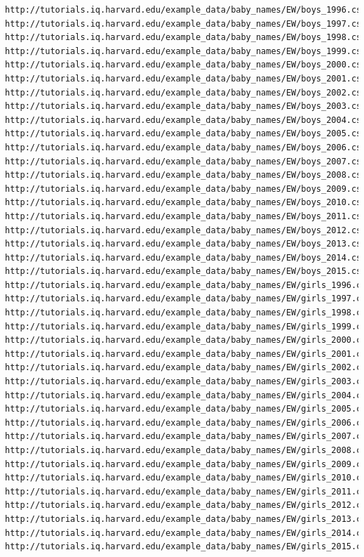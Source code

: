 \documentclass[]{book}
\begin{document}
\begin{verbatim}
http://tutorials.iq.harvard.edu/example_data/baby_names/EW/boys_1996.csv
http://tutorials.iq.harvard.edu/example_data/baby_names/EW/boys_1997.csv
http://tutorials.iq.harvard.edu/example_data/baby_names/EW/boys_1998.csv
http://tutorials.iq.harvard.edu/example_data/baby_names/EW/boys_1999.csv
http://tutorials.iq.harvard.edu/example_data/baby_names/EW/boys_2000.csv
http://tutorials.iq.harvard.edu/example_data/baby_names/EW/boys_2001.csv
http://tutorials.iq.harvard.edu/example_data/baby_names/EW/boys_2002.csv
http://tutorials.iq.harvard.edu/example_data/baby_names/EW/boys_2003.csv
http://tutorials.iq.harvard.edu/example_data/baby_names/EW/boys_2004.csv
http://tutorials.iq.harvard.edu/example_data/baby_names/EW/boys_2005.csv
http://tutorials.iq.harvard.edu/example_data/baby_names/EW/boys_2006.csv
http://tutorials.iq.harvard.edu/example_data/baby_names/EW/boys_2007.csv
http://tutorials.iq.harvard.edu/example_data/baby_names/EW/boys_2008.csv
http://tutorials.iq.harvard.edu/example_data/baby_names/EW/boys_2009.csv
http://tutorials.iq.harvard.edu/example_data/baby_names/EW/boys_2010.csv
http://tutorials.iq.harvard.edu/example_data/baby_names/EW/boys_2011.csv
http://tutorials.iq.harvard.edu/example_data/baby_names/EW/boys_2012.csv
http://tutorials.iq.harvard.edu/example_data/baby_names/EW/boys_2013.csv
http://tutorials.iq.harvard.edu/example_data/baby_names/EW/boys_2014.csv
http://tutorials.iq.harvard.edu/example_data/baby_names/EW/boys_2015.csv
http://tutorials.iq.harvard.edu/example_data/baby_names/EW/girls_1996.csv
http://tutorials.iq.harvard.edu/example_data/baby_names/EW/girls_1997.csv
http://tutorials.iq.harvard.edu/example_data/baby_names/EW/girls_1998.csv
http://tutorials.iq.harvard.edu/example_data/baby_names/EW/girls_1999.csv
http://tutorials.iq.harvard.edu/example_data/baby_names/EW/girls_2000.csv
http://tutorials.iq.harvard.edu/example_data/baby_names/EW/girls_2001.csv
http://tutorials.iq.harvard.edu/example_data/baby_names/EW/girls_2002.csv
http://tutorials.iq.harvard.edu/example_data/baby_names/EW/girls_2003.csv
http://tutorials.iq.harvard.edu/example_data/baby_names/EW/girls_2004.csv
http://tutorials.iq.harvard.edu/example_data/baby_names/EW/girls_2005.csv
http://tutorials.iq.harvard.edu/example_data/baby_names/EW/girls_2006.csv
http://tutorials.iq.harvard.edu/example_data/baby_names/EW/girls_2007.csv
http://tutorials.iq.harvard.edu/example_data/baby_names/EW/girls_2008.csv
http://tutorials.iq.harvard.edu/example_data/baby_names/EW/girls_2009.csv
http://tutorials.iq.harvard.edu/example_data/baby_names/EW/girls_2010.csv
http://tutorials.iq.harvard.edu/example_data/baby_names/EW/girls_2011.csv
http://tutorials.iq.harvard.edu/example_data/baby_names/EW/girls_2012.csv
http://tutorials.iq.harvard.edu/example_data/baby_names/EW/girls_2013.csv
http://tutorials.iq.harvard.edu/example_data/baby_names/EW/girls_2014.csv
http://tutorials.iq.harvard.edu/example_data/baby_names/EW/girls_2015.csv
\end{verbatim}
\end{document}
